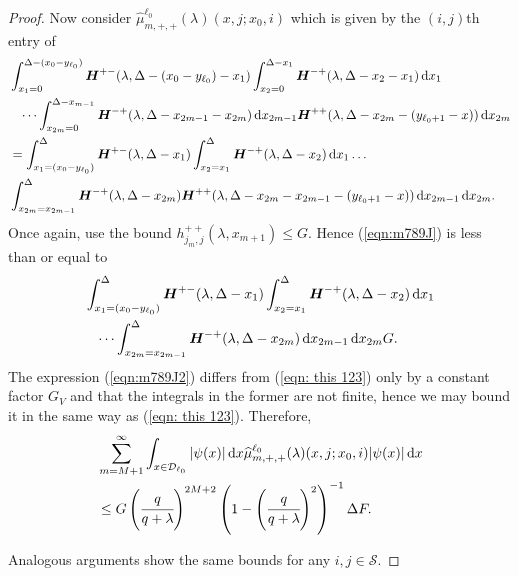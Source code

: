 \begin{proof}
        Now consider \(\widehat\mu_{m,+,+}^{\ell_0}(\lambda)( x,j;x_0,i) \) which is given by the \((i,j)\)th entry of 
        \begin{align}
		\nonumber& \int_{x_1 = 0}^{\Delta-(x_0-y_{\ell_0})} \boldsymbol H^{+-}(\lambda,\Delta-(x_0-y_{\ell_0})-x_1) \int_{x_2 = 0}^{\Delta-x_1} \boldsymbol H^{-+}(\lambda,\Delta - x_2-x_1) \, \mathrm{d} x_1 
		\\\nonumber &\quad\dots  
		\int_{x_{2m}=0}^{\Delta-x_{m-1}} \boldsymbol H^{-+}(\lambda,\Delta -x_{2m-1} - x_{2m}) \, \mathrm{d} x_{2m-1}
		 \boldsymbol H^{++}(\lambda,\Delta -x_{2m}- (y_{\ell_0+1}- x))\, \mathrm{d} x_{2m}
		\\\nonumber&= \int_{x_1 = (x_0-y_{\ell_0})}^{\Delta} \boldsymbol H^{+-}(\lambda,\Delta-x_1) \int_{x_2 = x_1}^{\Delta} \boldsymbol H^{-+}(\lambda,\Delta -x_2) \, \mathrm{d} x_1 
		\dots  
		\\&\int_{x_{2m}=x_{2m-1}}^{\Delta} \boldsymbol H^{-+}(\lambda,\Delta - x_{2m}) 
		\boldsymbol H^{++}(\lambda,\Delta -x_{2m}-x_{2m-1}- (y_{\ell_0+1}- x)) 
		\, \mathrm{d} x_{2m-1}\, \mathrm{d} x_{2m}.\label{eqn:m789J}
        \end{align}
        Once again, use the bound \(h^{++}_{j_m,j}(\lambda,x_{m+1})\leq G\). Hence (\ref{eqn:m789J}) is less than or equal to 
        \begin{align}
        		&\int_{x_1 = (x_0-y_{\ell_0})}^{\Delta} \boldsymbol H^{+-}(\lambda,\Delta-x_1) \int_{x_2 = x_1}^{\Delta} \boldsymbol H^{-+}(\lambda,\Delta -x_2) \, \mathrm{d} x_1 \nonumber
		\\&\quad\dots  
		\int_{x_{2m}=x_{2m-1}}^{\Delta} \boldsymbol H^{-+}(\lambda,\Delta - x_{2m})  
		\, \mathrm{d} x_{2m-1}\, \mathrm{d} x_{2m}G.\label{eqn:m789J2}
        \end{align}
        The expression (\ref{eqn:m789J2}) differs from (\ref{eqn: this 123}) only by a constant factor \(G_V\) and that the integrals in the former are not finite, hence we may bound it in the same way as (\ref{eqn: this 123}). Therefore, 
        \begin{align}
	         & \sum_{m=M+1}^\infty \int_{x\in\mathcal{D}_{\ell_0}} |\psi(x)|\, \mathrm{d} x \widehat \mu^{\ell_0}_{m,+,+}(\lambda)(x,j;x_0,i) |\psi(x)|\, \mathrm{d} x \nonumber
	        \\&\leq G\left(\cfrac{q}{q+\lambda}\right)^{2M+2} \left(1-\left(\cfrac{q}{q+\lambda}\right)^2\right)^{-1}\Delta F.
        \end{align}
        
	Analogous arguments show the same bounds for any \(i,j\in\mathcal S\). 
\end{proof}


